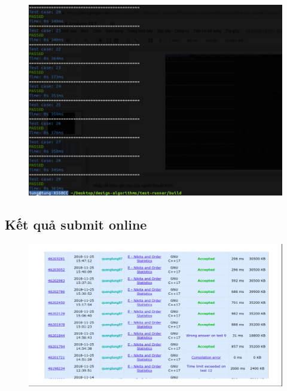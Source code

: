 \documentclass[../report.tex]{subfiles}
\begin{document}
\begin{figure}[H]
\centering
\includegraphics[width=\textwidth]{figures/test-993e-2.png}
\end{figure}

\subsection{Kết quả submit online}
\begin{figure}[H]
\centering
\includegraphics[width=\textwidth]{figures/submit-993e.png}
\end{figure}
\end{document}
